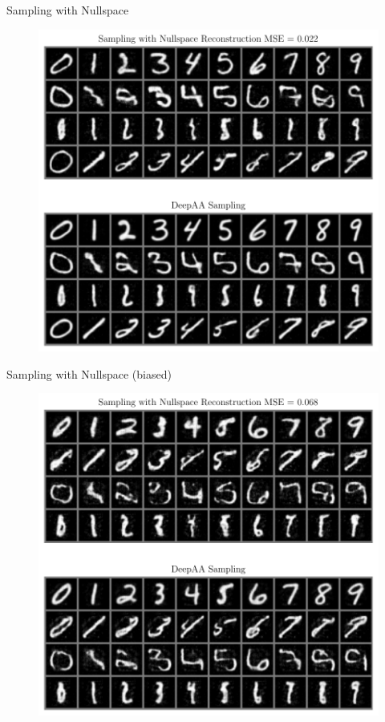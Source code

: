 \documentclass[aspectratio=169]{beamer}
\begin{document}
\begin{frame}{Sampling with Nullspace}
\begin{figure}[htpb]
	\includegraphics[height=0.7\textheight]{figures/samples/aa_nullspace.pdf}
\end{figure}
\end{frame}

\begin{frame}{Sampling with Nullspace (biased)}
\begin{figure}[htpb]
	\includegraphics[height=0.7\textheight]{figures/samples/aa_nullspace_bias_y.pdf}
\end{figure}
\end{frame}
\end{document}
